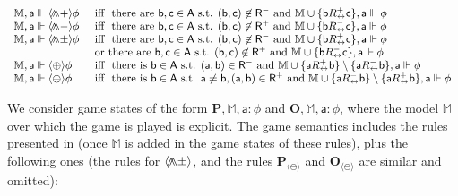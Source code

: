 \documentclass{easychair}
\newcommand{\A}{\mathsf{A}}
\newcommand{\R}{\mathsf{R}}
\newcommand{\ag}{\mathsf{a}}
\renewcommand{\b}{\mathsf{b}}
\renewcommand{\c}{\mathsf{c}}
\newcommand{\pnlP}{\langle \bigdoublewedge+ \rangle }
\newcommand{\pnlN}{\langle\bigdoublewedge-\rangle}
\newcommand{\pnlPN}{\langle\bigdoublewedge\pm\rangle}
\newcommand{\pnlOP}{\langle\oplus\rangle}
\newcommand{\pnlON}{\langle\ominus\rangle}
\DeclareMathOperator*{\bigdoublewedge}{\wedge\mkern-15mu\wedge}
\newcommand{\bbM}{\mathbb{M}}
\newcommand{\bfP}{\mathbf{P}}
\newcommand{\bfO}{\mathbf{O}}
\newcommand{\Rinv}{R_{\leftrightarrow}}
\begin{document}
\noindent
$
\small
\begin{array}{lll}
    \bbM,\ag \Vdash \pnlP\phi &\text{ iff } \text{  there are } \b,\c\in \A \text{ s.t. }   (\b,\c)\not\in \R^- \text{ and }  \bbM\cup\{\b \Rinv^+ \c\},\ag \Vdash  \phi\\
    \bbM,\ag \Vdash \pnlN\phi &\text{ iff } \text{  there are } \b,\c\in \A \text{ s.t. }   (\b,\c)\not\in \R^+ \text{ and }  \bbM\cup\{\b \Rinv^- \c\},\ag \Vdash  \phi\\
    \bbM,\ag \Vdash \pnlPN\phi &\text{ iff } \text{ there are } \b,\c\in \A \text{ s.t. }   (\b,\c)\not\in \R^- \text{ and }  \bbM\cup\{\b \Rinv^+ \c\},\ag \Vdash  \phi\\
                               & \text{ or there are } \b,\c\in \A \text{ s.t. }   (\b,\c)\not\in \R^+ \text{ and }  \bbM\cup\{\b \Rinv^- \c\},\ag \Vdash  \phi\\
    \bbM,\ag \Vdash \pnlOP\phi &\text{ iff } \text{ there is } \b \in \A \text{ s.t. }  (\ag,\b)\in \R^- \text{ and }  \bbM\cup\{\ag \Rinv^+ \b\} \setminus\{\ag \Rinv^- \b\},\ag \Vdash \phi\\
    \bbM,\ag \Vdash \pnlON\phi &\text{ iff } \text{ there is } \b \in \A \text{ s.t. }  \ag \neq \b, (\ag,\b)\in \R^+ \text{ and }  \bbM\cup\{\ag \Rinv^- \b\} \setminus\{\ag \Rinv^+ \b\},\ag \Vdash \phi\\
\end{array}
$


We consider game states of the form $\mathbf{P}, \bbM, \ag:\phi$ and
$\mathbf{O}, \bbM, \ag:\phi$, where the model $\bbM$ over which the
game is played is explicit. 
The game semantics includes the rules presented in
 (once $\bbM$ is added in the game states of these rules), plus the
following ones (the rules for $\pnlPN$, and the rules  $\bfP_{\pnlON}$ and $\bfO_{\pnlON}$ are similar and omitted):
\end{document}
